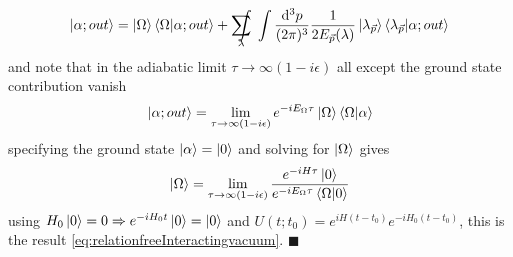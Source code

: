 		\begin{equation*}
			\ket{\alpha;out} = \ket{\Omega}\braket{\Omega}{\alpha;out} + \sum_\lambda \hspace{-0.4cm}\int \; \int \pmeasure \frac{1}{2E\vp(\lambda)} \ket{\lambda\vp}\braket{\lambda\vp}{\alpha;out}
		\end{equation*}
	and note that in the adiabatic limit $\tau\rightarrow \infty (1-i\epsilon)$ all except the ground state contribution vanish
	\begin{equation*}
		\ket{\alpha;out} = \lim_{\tau\rightarrow \infty(1-i \epsilon)} e^{-iE_\Omega \tau} \ket{\Omega}\braket{\Omega}{\alpha}
	\end{equation*}
specifying the ground state $\ket{\alpha}=\ket{0}$ and solving for $\ket{\Omega}$ gives
\begin{equation*}
	\ket{\Omega} = \lim_{\tau\rightarrow \infty(1-i \epsilon)} \frac{e^{-i H\tau} \ket{0}}{e^{-i E_\Omega \tau} \braket{\Omega}{0}}
\end{equation*}
using $H_0\ket{0}=0 \Rightarrow e^{-iH_0 t} \ket{0}=\ket{0}$ and $U(t;t_0) = e^{iH(t-t_0)} e^{-i H_0(t-t_0)}$, this is the result \ref{eq:relationfreeInteractingvacuum}. $\blacksquare$

